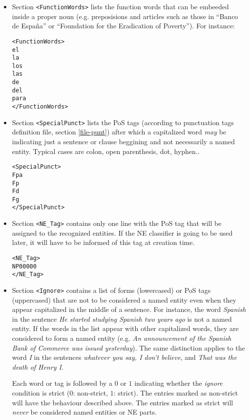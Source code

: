 \documentclass[a4paper]{book}
\begin{document}
\begin{itemize}
  \item Section \verb#<FunctionWords># lists the function words that can be
  embeeded inside a proper noun (e.g. preposisions and articles such
  as those in ``Banco de España'' or ``Foundation for the Eradication
  of Poverty''). For instance:
\begin{verbatim}
<FunctionWords>
el
la
los
las
de
del
para
</FunctionWords>
\end{verbatim}

 \item Section \verb#<SpecialPunct># lists the PoS tags (according to
  punctuation tags definition file, section \ref{file-punt}) after
  which a capitalized word {\sl may} be indicating just a sentence or clause
  beggining and not necessarily a named entity. Typical cases are
  colon, open parenthesis, dot, hyphen..
\begin{verbatim}
<SpecialPunct>
Fpa
Fp
Fd
Fg
</SpecialPunct>
\end{verbatim}

  \item Section \verb#<NE_Tag># contains only one line with the PoS tag that
  will be assigned to the recognized entities. If the NE classifier is
  going to be used later, it will have to be informed of this tag at
  creation time.
\begin{verbatim}
<NE_Tag>
NP00000
</NE_Tag>
\end{verbatim}

  \item Section \verb#<Ignore># contains a list of forms (lowercased)
    or PoS tags (uppercased) that are not to be considered a named
    entity even when they appear capitalized in the middle of a
    sentence.  For instance, the word {\em Spanish} in the sentence
    {\em He started studying Spanish two years ago} is not a named
    entity. If the words in the list appear with other capitalized
    words, they are considered to form a named entity (e.g. {\em An
      announcement of the Spanish Bank of Commerce was issued
      yesterday}). The same distinction applies to the word {\em I} in
    the sentences {\em whatever you say, I don't believe}, and {\em
      That was the death of Henry I}.

     Each word or tag is followed by a $0$ or $1$ indicating whether
     the {\sl ignore} condition is strict ($0$: non-strict, $1$:
     strict).  The entries marked as non-strict will have the
     behaviour described above.  The entries marked as strict will
     {\sl never} be considered named entities or NE parts.


\end{itemize}
\end{document}
